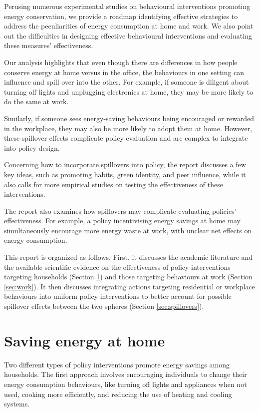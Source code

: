 \documentclass[
  11pt,
  captions=heading]{scrreport}
\begin{document}
Perusing numerous experimental studies on behavioural interventions
promoting energy conservation, we provide a roadmap identifying
effective strategies to address the peculiarities of energy consumption
at home and work. We also point out the difficulties in designing
effective behavioural interventions and evaluating these measures'
effectiveness.

Our analysis highlights that even though there are differences in how
people conserve energy at home versus in the office, the behaviours in
one setting can influence and spill over into the other. For example, if
someone is diligent about turning off lights and unplugging electronics
at home, they may be more likely to do the same at work.

Similarly, if someone sees energy-saving behaviours being encouraged or
rewarded in the workplace, they may also be more likely to adopt them at
home. However, these spillover effects complicate policy evaluation and
are complex to integrate into policy design.

Concerning how to incorporate spillovers into policy, the report
discusses a few key ideas, such as promoting habits, green identity, and
peer influence, while it also calls for more empirical studies on
testing the effectiveness of these interventions.

The report also examines how spillovers may complicate evaluating
policies' effectiveness. For example, a policy incentivising energy
savings at home may simultaneously encourage more energy waste at work,
with unclear net effects on energy consumption.

This report is organized as follows. First, it discusses the academic
literature and the available scientific evidence on the effectiveness of
policy interventions targeting households (Section \ref{sec:home}) and
those targeting behaviours at work (Section \ref{sec:work}). It then
discusses integrating actions targeting residential or workplace
behaviours into uniform policy interventions to better account for
possible spillover effects between the two spheres (Section
\ref{sec:spillovers}).

\hypertarget{sec:home}{%
\chapter{Saving energy at home}\label{sec:home}}

Two different types of policy interventions promote energy savings among
households. The first approach involves encouraging individuals to
change their energy consumption behaviours, like turning off lights and
appliances when not used, cooking more efficiently, and reducing the use
of heating and cooling systems.
\end{document}
